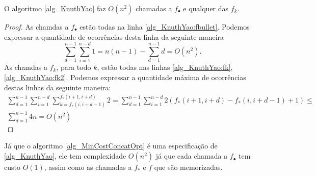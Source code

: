 \begin{prop}
O algoritmo \ref{alg_KnuthYao} faz $O(n^2)$ chamadas a $f_\bullet$ e qualquer das $f_k$.
\end{prop}

\begin{proof}
As chamdas a $f_\bullet$ estão todas na linha \ref{alg_KnuthYao:fbullet}. Podemos expressar a quantidade de ocorrências desta linha da seguinte maneira
$$ \sum\limits_{d=1}^{n-1} \sum\limits_{i=1}^{n-d} 1 = n(n-1) - \sum\limits_{d=1}^{n-1} d = O(n^2). $$
As chamdas a $f_k$, para todo $k$, estão todas nas linhas \ref{alg_KnuthYao:fk}, \ref{alg_KnuthYao:fk2}. Podemos expressar a quantidade máxima de ocorrências destas linhas da seguinte maneira:
\begin{multline*} 
\sum\limits_{d=1}^{n-1} \sum\limits_{i=1}^{n-d} \sum\limits_{k=f_*(i,i+d-1)}^{f_*(i+1,i+d)} 2 =
\sum\limits_{d=1}^{n-1} \sum\limits_{i=1}^{n-d} 2(f_*(i+1,i+d) - f_*(i,i+d-1) + 1) \leq \\
\sum\limits_{d=1}^{n-1} 4n = O(n^2)
\end{multline*}
\end{proof}

Já que o algoritmo \ref{alg_MinCostConcatOpt} é uma especificação de \ref{alg_KnuthYao}, ele tem complexidade $O(n^2)$ já que cada chamada a $f_\bullet$ tem custo $O(1)$, assim como as chamadas a $f_*$ e $f$ que são memorizadas.

